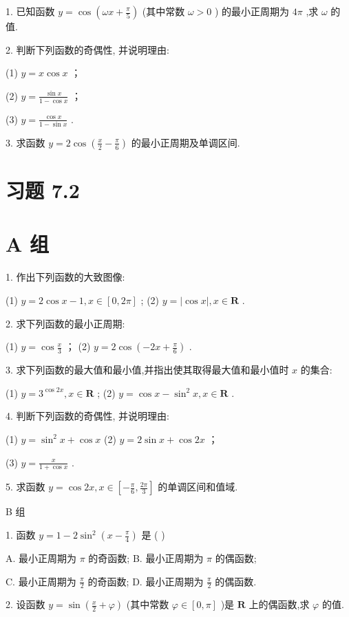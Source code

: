 \documentclass[10pt]{article}
\begin{document}
1. 已知函数 \(y = \cos \left( {{\omega x} + \frac{\pi }{5}}\right)\) (其中常数 \(\omega  > 0\) ) 的最小正周期为 \({4\pi }\) ,求 \(\omega\) 的值.

2. 判断下列函数的奇偶性, 并说明理由:

(1) \(y = x\cos x\) ；

(2) \(y = \frac{\sin x}{1 - \cos x}\) ；

(3) \(y = \frac{\cos x}{1 - \sin x}\) .

3. 求函数 \(y = 2\cos \left( {\frac{x}{2} - \frac{\pi }{6}}\right)\) 的最小正周期及单调区间.

\section*{习题 7.2}

\section*{A 组}

1. 作出下列函数的大致图像:

(1) \(y = 2\cos x - 1,x \in  \left\lbrack  {0,{2\pi }}\right\rbrack\) ; (2) \(y = \left| {\cos x}\right| ,x \in  \mathbf{R}\) .

2. 求下列函数的最小正周期:

(1) \(y = \cos \frac{x}{3}\) ； (2) \(y = 2\cos \left( {-{2x} + \frac{\pi }{6}}\right)\) .

3. 求下列函数的最大值和最小值,并指出使其取得最大值和最小值时 \(x\) 的集合:

(1) \(y = {3}^{\cos {2x}},x \in  \mathbf{R}\) ; (2) \(y = \cos x - {\sin }^{2}x,x \in  \mathbf{R}\) .

4. 判断下列函数的奇偶性, 并说明理由:

(1) \(y = {\sin }^{2}x + \cos x\) (2) \(y = 2\sin x + \cos {2x}\) ；

(3) \(y = \frac{x}{1 + \cos x}\) .

5. 求函数 \(y = \cos {2x},x \in  \left\lbrack  {-\frac{\pi }{6},\frac{2\pi }{3}}\right\rbrack\) 的单调区间和值域.

B 组

1. 函数 \(y = 1 - 2{\sin }^{2}\left( {x - \frac{\pi }{4}}\right)\) 是 ( )

A. 最小正周期为 \(\pi\) 的奇函数; B. 最小正周期为 \(\pi\) 的偶函数;

C. 最小正周期为 \(\frac{\pi }{2}\) 的奇函数; D. 最小正周期为 \(\frac{\pi }{2}\) 的偶函数.

2. 设函数 \(y = \sin \left( {\frac{x}{2} + \varphi }\right)\) (其中常数 \(\varphi  \in  \left\lbrack  {0,\pi }\right\rbrack\) )是 \(\mathbf{R}\) 上的偶函数,求 \(\varphi\) 的值.
\end{document}
